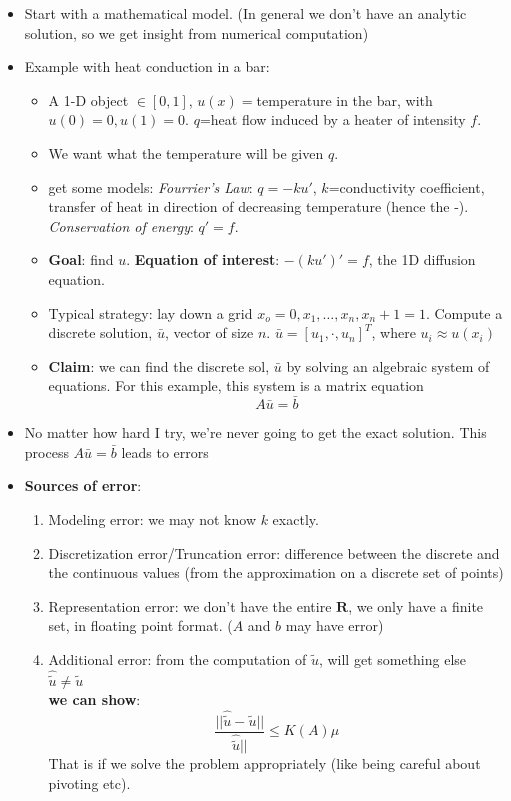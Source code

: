 \begin{itemize}
\item Start with a mathematical model. (In general we don't have an analytic solution, so we get
  insight from numerical computation)
\item Example with heat conduction in a bar:
  \begin{itemize}
  \item A 1-D object $\in [0, 1]$, $u(x)=$temperature in the bar, with
  $u(0)=0, u(1) = 0$. $q$=heat flow induced by a heater of intensity $f$.
  \item We want what the temperature will be given $q$.
  \item get some models: \emph{Fourrier's Law}: $q= -ku'$, $k$=conductivity
    coefficient, transfer of heat in direction of decreasing
    temperature (hence the -). \emph{Conservation of energy}: $q' = f$.
  \item \textbf{Goal}: find $u$. \textbf{Equation of interest}: $-(ku')' = f$, the 1D diffusion
    equation.
  \item Typical strategy: lay down a grid $x_o=0, x_1, \dots, x_n,
    x_n+1=1$. Compute a discrete solution, $\bar{u}$, vector of size $n$. $\bar{u} = [u_1, \cdot, u_n]^T$, where $u_i \approx u(x_i)$
  \item \textbf{Claim}: we can find the discrete sol, $\bar{u}$ by
    solving an algebraic system of equations. For this example, this
    system is a matrix equation $$A\bar{u} = \bar{b}$$

  \end{itemize}
  \item No matter how hard I try, we're never going to get the exact
    solution. This process $A\bar{u}=\bar{b}$ leads to errors
  \item \textbf{Sources of error}:
    \begin{enumerate}
       \item Modeling error: we may not know $k$ exactly.
       \item Discretization error/Truncation error: difference between the discrete and
         the continuous values (from the approximation on a discrete
         set of points)
       \item Representation error: we don't have the entire
         $\mathbf{R}$, we only have a finite set, in floating point
         format. ($A$ and $b$ may have error)
       \item Additional error: from the computation of $\tilde{u}$,
         will get something else $\hat{\tilde{u}}\neq \tilde{u}$\\
        \textbf{we can show}: $$\frac{||\hat{\tilde{u}} -
           \tilde{u}||}{\hat{\tilde{u}}||} \le K(A)\mu$$ That is if we
         solve the problem appropriately (like being careful about
         pivoting etc).
         

\end{enumerate}
\end{itemize}
